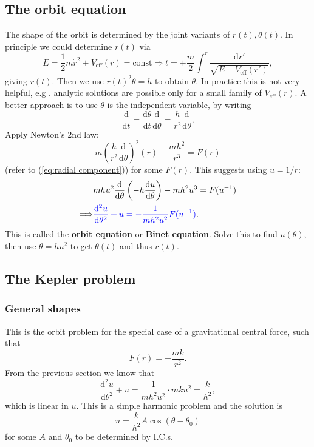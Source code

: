 \subsection{The orbit equation}
The shape of the orbit is determined by the joint variants of $ r(t),\theta(t) $. In principle we could determine $r(t)$ via 
\[
    E=\frac{1}{2}m \dot{r}^2+V_{\text{eff}}(r)=\text{const} \Longrightarrow t = \pm \frac{m}{2}\int^{r} \frac{\mathrm{d} r'}{\sqrt{E-V_{\text{eff}}(r')}},
\]
giving $r(t)$. Then we use $ r(t)^2 \dot{\theta}=h $ to obtain $\theta$. In practice this is not very helpful, e.g . analytic solutions are possible only for a small family of $ V_{\text{eff}}(r) $. A better approach is to use $ \theta $ is the independent variable, by writing
\[
    \frac{\mathrm{d}}{\mathrm{d}t} = \frac{\mathrm{d}\theta}{\mathrm{d}t}\frac{\mathrm{d}}{\mathrm{d}\theta} = \frac{h}{r^2}\frac{\mathrm{d}}{\mathrm{d}\theta}.    
\]
Apply Newton's 2nd law: 
\[
    m \left( \frac{h}{r^2}\frac{\mathrm{d}}{\mathrm{d}\theta} \right)^2(r)-\frac{mh^2}{r^3}=F(r)
\]
(refer to (\ref{eq:radial component})) for some $F(r)$. This suggests using $u=1/r$: 
\begin{align*}
    &mhu^2 \frac{\mathrm{d}}{\mathrm{d}\theta}\left( -h \frac{\mathrm{d}u}{\mathrm{d}\theta}  \right) -mh^2u^3=F(u^{-1})\\ 
    \Longrightarrow & {\color{blue}\frac{\mathrm{d}^2 u}{\mathrm{d}\theta^2}+u = -\frac{1}{mh^2u^2} F(u^{-1})}.
\end{align*}
This is called the \textbf{orbit equation} or \textbf{Binet equation}. Solve this to find $ u(\theta) $, then use $ \dot{\theta} = hu^2 $ to get $ \theta(t) $ and thus $ r(t) $.

\subsection{The Kepler problem}
\subsubsection*{General shapes}
This is the orbit problem for the special case of a gravitational central force, such that 
\[
    F(r) = -\frac{mk}{r^2}.
\]
From the previous section we know that 
\[
    \frac{\mathrm{d}^2 u}{\mathrm{d}\theta^2}+u = \frac{1}{mh^2u^2} \cdot mku^2 = \frac{k}{h^2},
\]
which is linear in $u$. This is a simple harmonic problem and the solution is 
\[
    u = \frac{k}{h^2}A \cos (\theta-\theta_0)
\]
for some $A$ and $ \theta_0 $ to be determined by I.C.s. 

